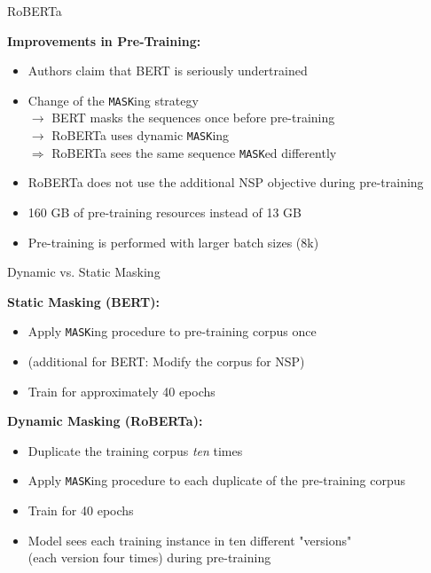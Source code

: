 \documentclass[]{beamer}
\begin{document}
\begin{frame}{RoBERTa \href{https://arxiv.org/pdf/1907.11692.pdf}{}}

	\textbf{Improvements in Pre-Training:}

	\begin{itemize}
		\item Authors claim that BERT is seriously undertrained
		\item Change of the \texttt{MASK}ing strategy  \\
					$\rightarrow$ BERT masks the sequences once before pre-training  \\
					$\rightarrow$ RoBERTa uses dynamic \texttt{MASK}ing  \\
					$\Rightarrow$ RoBERTa sees the same sequence \texttt{MASK}ed differently
		\item RoBERTa does not use the additional NSP objective during pre-training
		\item 160 GB of pre-training resources instead of 13 GB
		\item Pre-training is performed with larger batch sizes (8k)
	\end{itemize}
\end{frame}



\begin{frame}{Dynamic vs. Static Masking \href{https://arxiv.org/pdf/1907.11692.pdf}{}}

	\textbf{Static Masking (BERT):}

	\begin{itemize}
		\item Apply \texttt{MASK}ing procedure to pre-training corpus once
		\item (additional for BERT: Modify the corpus for NSP)
		\item Train for approximately 40 epochs
	\end{itemize}

\vspace{.3cm}

	\textbf{Dynamic Masking (RoBERTa):}

	\begin{itemize}
		\item Duplicate the training corpus \textit{ten} times
		\item Apply \texttt{MASK}ing procedure to each duplicate of the pre-training corpus
		\item Train for 40 epochs
		\item Model sees each training instance in ten different "versions"\\
					(each version four times) during pre-training
	\end{itemize}
\end{frame}
\end{document}
